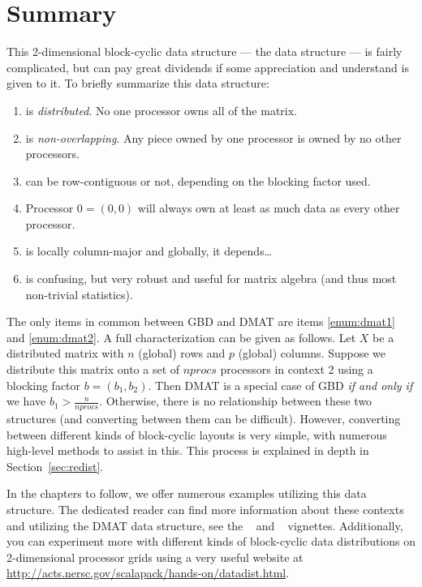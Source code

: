 \section{Summary}

This 2-dimensional block-cyclic data structure --- the  data 
structure --- is fairly complicated, but can pay great dividends if some 
appreciation and understand is given to it.  To briefly summarize this data 
structure:
\begin{enumerate}
  \item {} is \emph{distributed}.  No one processor owns all of the matrix. \label{enum:dmat1}
  \item {} is \emph{non-overlapping}. Any piece owned by one processor 
is owned by no other processors.\label{enum:dmat2} \item {} can be 
row-contiguous or not, depending on the blocking factor used.
  \item Processor $0 = (0,0)$ will always own at least as much data as every 
other processor.
  \item {} is locally column-major and globally, it depends\dots
  \item {} is confusing, but very robust and useful for matrix algebra (and thus most non-trivial statistics).
\end{enumerate}

The only items in common between GBD and DMAT are items \ref{enum:dmat1} and 
\ref{enum:dmat2}.  A full characterization can be given as follows.  Let $X$ be 
a distributed matrix with $n$ (global) rows and $p$ (global) columns.  Suppose 
we distribute this matrix onto a set of $nprocs$ processors in context 2 using a 
blocking factor $b=(b_1, b_2)$.  Then DMAT is a special case of GBD \emph{if 
and only if} we have $b_1 > \frac{n}{nprocs}$.  Otherwise, there is no 
relationship between these two structures (and converting between them can be 
difficult).  However, converting between different kinds of block-cyclic 
layouts is very simple, with numerous high-level methods to assist in this.  
This process is explained in depth in Section~\ref{sec:redist}.

In the chapters to follow, we offer numerous examples utilizing this data 
structure. The dedicated reader can find more information about these contexts 
and utilizing the DMAT data structure, see the 
~\citep{Schmidt2012pbdBASEvignette} and 
~\citep{Schmidt2012pbdDMATvignette} vignettes.  Additionally, you 
can experiment more with different kinds of block-cyclic data distributions on 
2-dimensional processor grids using
a very useful website at
\url{http://acts.nersc.gov/scalapack/hands-on/datadist.html}.




